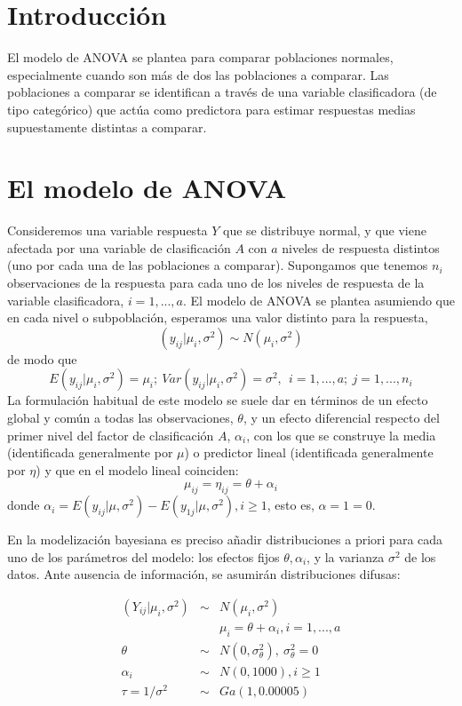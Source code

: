 \documentclass[
]{book}
\begin{document}
\hypertarget{introducciuxf3n-1}{%
\section{Introducción}\label{introducciuxf3n-1}}

El modelo de ANOVA se plantea para comparar poblaciones normales, especialmente cuando son más de dos las poblaciones a comparar. Las poblaciones a comparar se identifican a través de una variable clasificadora (de tipo categórico) que actúa como predictora para estimar respuestas medias supuestamente distintas a comparar.

\hypertarget{el-modelo-de-anova}{%
\section{El modelo de ANOVA}\label{el-modelo-de-anova}}

Consideremos una variable respuesta \(Y\) que se distribuye normal, y que viene afectada por una variable de clasificación \(A\) con \(a\) niveles de respuesta distintos (uno por cada una de las poblaciones a comparar). Supongamos que tenemos \(n_i\) observaciones de la respuesta para cada uno de los niveles de respuesta de la variable clasificadora, \(i=1,...,a\). El modelo de ANOVA se plantea asumiendo que en cada nivel o subpoblación, esperamos una valor distinto para la respuesta,
\[(y_{ij}|\mu_i,\sigma^2) \sim N(\mu_i,\sigma^2)\]
de modo que
\[E(y_{ij}|\mu_i,\sigma^2)=\mu_i; \ Var(y_{ij}|\mu_i,\sigma^2)=\sigma^2, \ \ i=1,...,a; \ j=1,...,n_i\]
La formulación habitual de este modelo se suele dar en términos de un efecto global y común a todas las observaciones, \(\theta\), y un efecto diferencial respecto del primer nivel del factor de clasificación \(A\), \(\alpha_i\), con los que se construye la media (identificada generalmente por \(\mu\)) o predictor lineal (identificada generalmente por \(\eta\)) y que en el modelo lineal coinciden:
\[\mu_{ij}=\eta_{ij}=\theta + \alpha_i\]
donde \(\alpha_i=E(y_{ij}|\mu,\sigma^2)-E(y_{1j}|\mu,\sigma^2), i\geq 1\), esto es, \(\alpha=1=0\).

En la modelización bayesiana es preciso añadir distribuciones a priori para cada uno de los parámetros del modelo: los efectos fijos \(\theta,\alpha_i\), y la varianza \(\sigma^2\) de los datos. Ante ausencia de información, se asumirán distribuciones difusas:

\begin{eqnarray*}
(Y_{ij}|\mu_i,\sigma^2) & \sim & N(\mu_i,\sigma^2) \\
&& \mu_i = \theta + \alpha_i, i=1,...,a \\
\theta & \sim & N(0,\sigma_{\theta}^2), \ \sigma_{\theta}^2=0 \\
\alpha_i & \sim & N(0,1000), i\geq 1\\
\tau=1/\sigma^2 & \sim & Ga(1,0.00005)
\end{eqnarray*}
\end{document}

